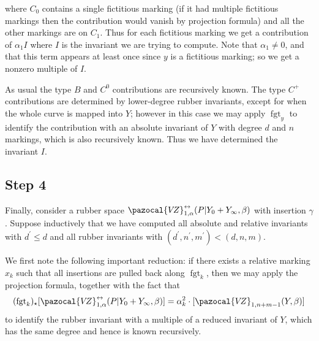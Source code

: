 \documentclass[11pt]{amsart}
\newcommand{\sqC}{\scalebox{0.8}[1.3]{$\sqsubset$}}
\newcommand{\VZ}{\pazocal{V\!Z}}
\newcommand{\st}{\star}
\newcommand{\fgt}{\operatorname{fgt}}
\theoremstyle{definition}
\theoremstyle{definition}
\begin{document}
\begin{center}
\end{center}
where $C_0$ contains a single fictitious marking (if it had multiple fictitious markings then the contribution would vanish by projection formula) and all the other markings are on $C_1$. Thus for each fictitious marking we get a contribution of $\alpha_1 I$ where $I$ is the invariant we are trying to compute. Note that $\alpha_1 \neq 0$, and that this term appears at least once since $y$ is a fictitious marking; so we get a nonzero multiple of $I$.

As usual the type $B$ and $C^0$ contributions are recursively known. The type $C^+$ contributions are determined by lower-degree rubber invariants, except for when the whole curve is mapped into $Y$; however in this case we may apply $\fgt_y$ to identify the contribution with an absolute invariant of $Y$ with degree $d$ and $n$ markings, which is also recursively known. Thus we have determined the invariant $I$.

\subsection*{Step 4} Finally, consider a rubber space $\VZ^{\leftrightarrow}_{1,\alpha}(P|Y_0+Y_\infty,\beta)$ with insertion $\gamma$. Suppose inductively that we have computed all absolute and relative invariants with $d^\prime \leq d$ and all rubber invariants with $(d^\prime,n^\prime,m^\prime) < (d,n,m)$.

We first note the following important reduction: if there exists a relative marking $x_k$ such that all insertions are pulled back along $\fgt_{k}$, then we may apply the projection formula, together with the fact that
\begin{equation*} (\fgt_{k})_\st [\VZ^{\leftrightarrow}_{1,\alpha}(P|Y_0+Y_\infty,\beta)] = \alpha_k^2 \cdot [\VZ_{1,n+m-1}(Y,\beta)] \end{equation*}
to identify the rubber invariant with a multiple of a reduced invariant of $Y$, which has the same degree and hence is known recursively.
\end{document}
